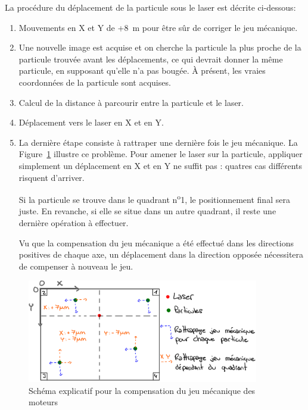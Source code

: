 La procédure du déplacement de la particule sous le laser est décrite ci-dessous:
\begin{enumerate}
    \item Mouvements en X et Y de +8~\textmu m pour être sûr de corriger le jeu mécanique.
    \item Une nouvelle image est acquise et on cherche la particule la plus proche de la particule trouvée avant les déplacements, ce qui devrait donner la même particule, en supposant qu'elle n'a pas bougée. À présent, les vraies coordonnées de la particule sont acquises.
    \item Calcul de la distance à parcourir entre la particule et le laser.
    \item Déplacement vers le laser en X et en Y.
    \item
          La dernière étape consiste à rattraper une dernière fois le jeu mécanique. La Figure~\ref{schema_explicatif_jeu} illustre ce problème. Pour amener le laser sur la particule, appliquer simplement un déplacement en X et en Y ne suffit pas :  quatres cas différents risquent d'arriver.

          Si la particule se trouve dans le quadrant n\textsuperscript{o}1, le positionnement final sera juste. En revanche, si elle se situe dans un autre quadrant, il reste une dernière opération à effectuer.

          Vu que la compensation du jeu mécanique a été effectué dans les directions positives de chaque axe, un déplacement dans la direction opposée nécessitera de compenser à nouveau le jeu.

\end{enumerate}
\begin{figure}[H]
    \centering
    \includegraphics[width=0.9\textwidth]{assets/figures/Application_ServoVision/Schema_explicatif_jeu_mecanique.jpeg}
    \caption{Schéma explicatif pour la compensation du jeu mécanique des moteurs}
    \label{schema_explicatif_jeu}
\end{figure}

